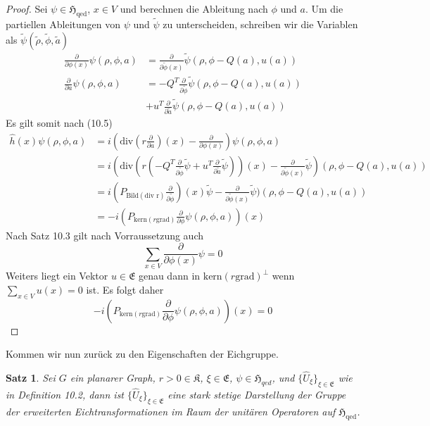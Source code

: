 \documentclass[11pt,a4paper,leqno]{report}
\newtheorem{proposition}{Satz}[chapter]
\numberwithin{equation}{chapter}
\begin{document}
\begin{proof}
	Sei $\psi\in \mathfrak{H}_{\text{qed}}$, $x\in V$ und berechnen die Ableitung nach $\phi$ und $a$. Um die partiellen Ableitungen von $\psi$ und $\tilde{\psi}$ zu unterscheiden, schreiben wir die Variablen als $\tilde{\psi}(\tilde{\rho},\tilde{\phi},\tilde{a})$
	\begin{align*}
		\frac{\partial}{\partial \phi(x)}\psi(\rho,\phi,a)&=\frac{\partial}{\partial \tilde{\phi}(x)}\tilde{\psi}(\rho, \phi-Q(a), u(a))\\
	\frac{\partial}{\partial a}\psi(\rho,\phi,a)&=-Q^T\frac{\partial}{\partial \tilde{\phi}}\tilde{\psi}(\rho, \phi-Q(a),  u(a))\\
	&+u^T\frac{\partial}{\partial \tilde{a}}\tilde{\psi}(\rho, \phi-Q(a), u(a))
	\end{align*}
Es gilt somit nach (10.5)
\begin{align*}
	\hat{h}(x)\psi(\rho,\phi,a) &= i(\text{div}(r\frac{\partial}{\partial a})(x)-\frac{\partial}{\partial\phi(x)})\psi(\rho,\phi,a)
	\\&=i(\text{div}(r(-Q^T\frac{\partial}{\partial \tilde{\phi}}\tilde{\psi}+u^T\frac{\partial}{\partial \tilde{a}}\tilde{\psi}))(x)-\frac{\partial}{\partial\tilde{\phi}(x)}\tilde{\psi})(\rho, \phi-Q(a), u(a))\\
	&=i(P_{\text{Bild}(\text{div r})}\frac{\partial}{\partial \tilde{\phi}})(x)\tilde{\psi}-\frac{\partial}{\partial\tilde{\phi}(x)}\tilde{\psi})(\rho, \phi-Q(a), u(a))\\
	&=-i(P_{\text{kern}(r\text{grad})}\frac{\partial}{\partial\phi}\psi(\rho,\phi,a))(x)
\end{align*}
Nach Satz 10.3 gilt nach Vorraussetzung auch
\begin{equation*}
\sum_{x\in V}\frac{\partial}{\partial \phi(x)}\psi = 0
\end{equation*}
Weiters liegt ein Vektor $u\in\mathfrak{E}$ genau dann in $\text{kern}(r\text{grad})^\perp$ wenn $\sum_{x\in V}u(x)=0$ ist. Es folgt daher
\begin{equation*}
-i(P_{\text{kern}(r\text{grad})}\frac{\partial}{\partial\phi}\psi(\rho,\phi,a))(x)=0
\end{equation*}
\end{proof}
\noindent
Kommen wir nun zur\"uck zu den Eigenschaften der Eichgruppe.
\begin{proposition}
	Sei $G$ ein planarer Graph, $r>0\in\mathfrak{K}$, $\xi\in \mathfrak{E}$, $\psi\in\mathfrak{H}_{qed}$,  und $\{\hat{U}_\xi\}_{\xi\in \mathfrak{E}}$ wie in Definition 10.2, dann ist $\{\hat{U}_\xi\}_{\xi\in \mathfrak{E}}$ eine stark stetige Darstellung der Gruppe der erweiterten Eichtransformationen im Raum der unit\"aren Operatoren auf $\mathfrak{H}_\text{qed}$.
\end{proposition}
\end{document}
